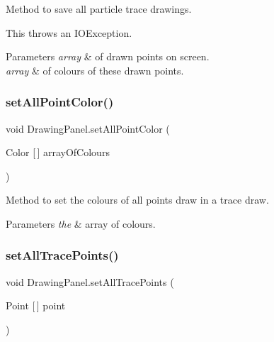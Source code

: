 Method to save all particle trace drawings. 

This throws an I\+O\+Exception. 
\begin{DoxyParams}{Parameters}
{\em array} & of drawn points on screen. \\
\hline
{\em array} & of colours of these drawn points. \\
\hline
\end{DoxyParams}
\mbox{\label{class_drawing_panel_a9816f7a7b7aeefeb6f0e5d9321eb94a2}} 
\subsubsection{\texorpdfstring{set\+All\+Point\+Color()}{setAllPointColor()}}
{\footnotesize\ttfamily void Drawing\+Panel.\+set\+All\+Point\+Color (\begin{DoxyParamCaption}\item[{Color \mbox{[}$\,$\mbox{]}}]{array\+Of\+Colours }\end{DoxyParamCaption})}



Method to set the colours of all points draw in a trace draw. 


\begin{DoxyParams}{Parameters}
{\em the} & array of colours. \\
\hline
\end{DoxyParams}
\mbox{\label{class_drawing_panel_a47cd7b7965dd2cb7e63f56a2737ffe39}} 
\subsubsection{\texorpdfstring{set\+All\+Trace\+Points()}{setAllTracePoints()}}
{\footnotesize\ttfamily void Drawing\+Panel.\+set\+All\+Trace\+Points (\begin{DoxyParamCaption}\item[{Point \mbox{[}$\,$\mbox{]}}]{point }\end{DoxyParamCaption})}



